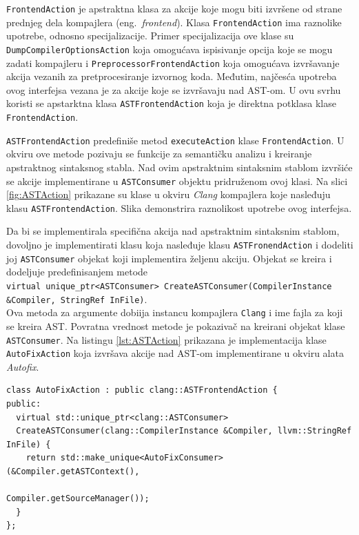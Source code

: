 \documentclass[12pt,oneside]{memoir}
\begin{document}
\texttt{FrontendAction} je apstraktna klasa za akcije koje mogu biti izvr\v{s}ene od strane prednjeg dela kompajlera (eng.~\textit{frontend}).
Klasa \texttt{FrontendAction} ima raznolike upotrebe, odnosno specijalizacije. Primer specijalizacija ove klase su \texttt{DumpCompiler\-OptionsAction}
koja omogu\'{c}ava ispisivanje opcija koje se mogu zadati kompajleru i \texttt{PreprocessorFrontendAction} koja omogu\'{c}ava izvr\v{s}avanje akcija vezanih za pretprocesiranje izvornog koda. Međutim, naj\v{c}es\'{c}a upotreba ovog interfejsa vezana je za akcije koje se izvr\v{s}avaju nad AST-om. U ovu svrhu koristi se apstarktna klasa \texttt{ASTFrontendAction} koja je direktna potklasa klase \texttt{FrontendAction}. \par
\texttt{ASTFrontendAction} predefini\v{s}e metod \texttt{executeAction} klase \texttt{FrontendAction}. U okviru ove metode pozivaju se funkcije za semanti\v{c}ku analizu i kreiranje apstraktnog sintaksnog stabla. Nad ovim apstraktnim sintaksnim stablom izvr\v{s}i\'{c}e se akcije implementirane u \texttt{ASTConsumer} objektu pridru\v{z}enom ovoj klasi.
Na slici \ref{fig:ASTAction} prikazane su klase u okviru \textit{Clang} kompajlera koje nasleđuju klasu \texttt{ASTFrontendAction}. Slika demonstrira raznolikost upotrebe ovog interfejsa. \par
Da bi se implementirala specifi\v{c}na akcija nad apstraktnim sintaksnim stablom, dovoljno je implementirati klasu koja nasleđuje klasu \texttt{ASTFronendAction} i dodeliti joj \texttt{ASTConsumer} objekat koji implementira \v{z}eljenu akciju. Objekat se kreira i dodeljuje predefinisanjem metode \\ \texttt{virtual unique\_ptr<ASTConsumer> CreateASTConsumer(CompilerInstance 
\&Compiler, StringRef InFile)}. \\
Ova metoda za argumente dobiija instancu kompajlera \texttt{Clang} i ime fajla za koji se kreira AST. Povratna vrednost metode je pokaziva\v{c} na kreirani objekat klase \texttt{ASTConsumer}.
Na listingu \ref{lst:ASTAction} prikazana je implementacija klase \texttt{AutoFixAction} koja izvr\v{s}ava akcije nad AST-om implementirane u okviru alata \textit{Autofix}.

\begin{lstlisting}[style=customc, basicstyle=\tiny, caption={Implementacija klase AutoFixAction kori\v{s}\'{c}ene u okviru alata \textit{Autofix}.}, label=lst:ASTAction]
class AutoFixAction : public clang::ASTFrontendAction {
public:
  virtual std::unique_ptr<clang::ASTConsumer>
  CreateASTConsumer(clang::CompilerInstance &Compiler, llvm::StringRef InFile) {
    return std::make_unique<AutoFixConsumer>(&Compiler.getASTContext(),
                                             Compiler.getSourceManager());
  }
};
\end{lstlisting}
\end{document}
